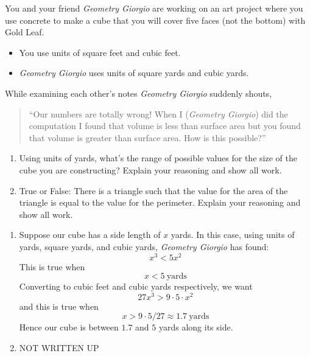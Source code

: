 \documentclass[handout,nooutcomes,noauthor,12pt]{ximera}
\begin{document}
\begin{question}
  You and your friend \textit{Geometry Giorgio} are working on an art
  project where you use concrete to make a cube that you will cover
  five faces (not the bottom) with Gold Leaf.
  \begin{itemize}
  \item You use units of square feet and cubic feet.
  \item \textit{Geometry Giorgio} uses units of square yards and cubic
    yards.
  \end{itemize}
  While examining each other's notes \textit{Geometry Giorgio}
  suddenly shouts,
  \begin{quote}
    ``Our numbers are totally wrong! When I (\textit{Geometry Giorgio})
    did the computation I found that volume is less than surface area
    but you found that volume is greater than surface area.  How is
    this possible?''
  \end{quote}
  \begin{enumerate}
  \item Using units of yards, what's the range of possible values
    for the size of the cube you are constructing? Explain your
    reasoning and show all work.
  \item True or False: There is a triangle such that the value for the
    area of the triangle is equal to the value for the
    perimeter. Explain your reasoning and show all work.
  \end{enumerate}
  \begin{freeResponse}
    \begin{enumerate}
    \item Suppose our cube has a side length of $x$ yards. In this
      case, using units of yards, square yards, and cubic yards,
      \textit{Geometry Giorgio} has found:
      \[
      x^3 < 5x^2
      \]
      This is true when
      \[
      x<5~\text{yards}
      \]
      Converting to cubic feet and cubic yards respectively, we want
      \[
      27x^3 > 9\cdot 5\cdot x^2
      \]
      and this is true when
      \[
      x > 9\cdot 5/27 \approx 1.7~\text{yards}
      \]
      Hence our cube is between $1.7$ and $5$ yards along its side.
    \item NOT WRITTEN UP
    \end{enumerate}
  \end{freeResponse}
\end{question}
\end{document}
